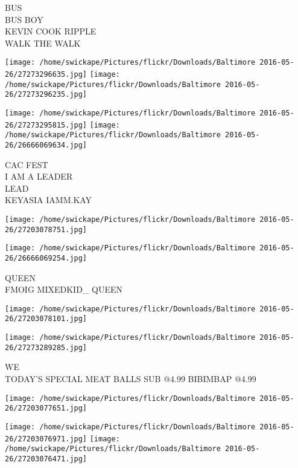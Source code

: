 \documentclass[10pt,letterpaper]{article}
\begin{document}
BUS\\
BUS BOY\\
KEVIN COOK RIPPLE\\
WALK THE WALK\\
\pagebreak

\texttt{[image: /home/swickape/Pictures/flickr/Downloads/Baltimore 2016-05-26/27273296635.jpg]}
\texttt{[image: /home/swickape/Pictures/flickr/Downloads/Baltimore 2016-05-26/27273296235.jpg]}

\texttt{[image: /home/swickape/Pictures/flickr/Downloads/Baltimore 2016-05-26/27273295815.jpg]}
\texttt{[image: /home/swickape/Pictures/flickr/Downloads/Baltimore 2016-05-26/26666069634.jpg]}

CAC FEST\\
I AM A LEADER\\
LEAD\\
KEYASIA IAMM.KAY\\
\pagebreak

\texttt{[image: /home/swickape/Pictures/flickr/Downloads/Baltimore 2016-05-26/27203078751.jpg]}

\vspace{0.25in}
\texttt{[image: /home/swickape/Pictures/flickr/Downloads/Baltimore 2016-05-26/26666069254.jpg]}

QUEEN\\
FMOIG MIXEDKID\_ QUEEN\\
\pagebreak

\texttt{[image: /home/swickape/Pictures/flickr/Downloads/Baltimore 2016-05-26/27203078101.jpg]}

\vspace{0.25in}
\texttt{[image: /home/swickape/Pictures/flickr/Downloads/Baltimore 2016-05-26/27273289285.jpg]}

WE\\
TODAY'S SPECIAL MEAT BALLS SUB @4.99 BIBIMBAP @4.99\\
\pagebreak

\texttt{[image: /home/swickape/Pictures/flickr/Downloads/Baltimore 2016-05-26/27203077651.jpg]}

\vspace{0.25in}
\texttt{[image: /home/swickape/Pictures/flickr/Downloads/Baltimore 2016-05-26/27203076971.jpg]}
\texttt{[image: /home/swickape/Pictures/flickr/Downloads/Baltimore 2016-05-26/27203076471.jpg]}
\end{document}
